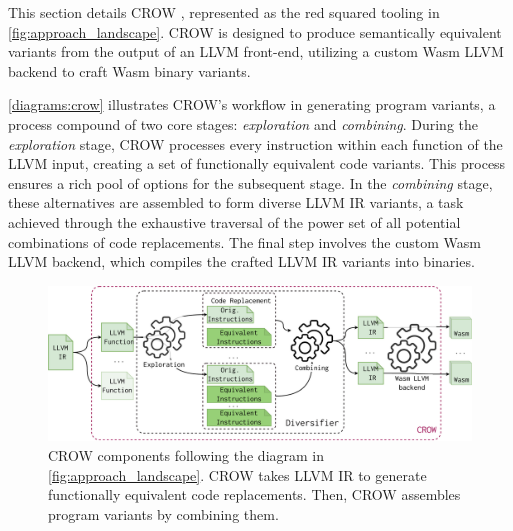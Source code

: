 
\label{section:crow}
\renewcommand{\tool}{CROW\xspace}

This section details CROW \cite{CROW}, represented as the red squared tooling in \autoref{fig:approach_landscape}. 
CROW is designed to produce semantically equivalent \wasm variants from the output of an LLVM front-end, utilizing a custom Wasm LLVM backend to craft Wasm binary variants.

\autoref{diagrams:crow} illustrates CROW's workflow in generating program variants, a process compound of two core stages: \textit{exploration} and \textit{combining}. 
During the \textit{exploration} stage, CROW processes every instruction within each function of the LLVM input, creating a set of functionally equivalent code variants. 
This process ensures a rich pool of options for the subsequent stage.
In the \textit{combining} stage, these alternatives are assembled to form diverse LLVM IR variants, a task achieved through the exhaustive traversal of the power set of all potential combinations of code replacements. 
The final step involves the custom Wasm LLVM backend, which compiles the crafted LLVM IR variants into \wasm binaries. 


\begin{figure}[h]
    \includegraphics[width=\linewidth]{diagrams/generation/crow.drawio.pdf}
    \caption{CROW components following the diagram in \autoref{fig:approach_landscape}. CROW takes LLVM IR to generate functionally equivalent code replacements. Then, CROW assembles program variants by combining them.}
    \label{diagrams:crow}
\end{figure}


